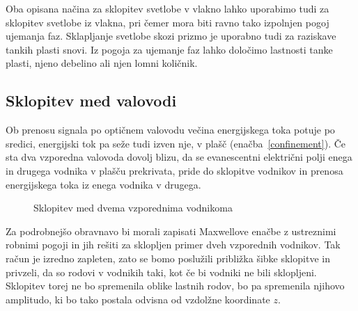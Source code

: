 \begin{remark}
 Oba opisana načina za sklopitev svetlobe v vlakno lahko uporabimo tudi za sklopitev svetlobe 
 iz vlakna, pri čemer mora biti ravno tako izpolnjen pogoj ujemanja faz. 
 Sklapljanje svetlobe skozi prizmo je uporabno tudi za raziskave tankih plasti snovi. 
 Iz pogoja za ujemanje faz lahko določimo lastnosti tanke plasti, njeno debelino ali njen lomni količnik. 
\end{remark}

\subsection*{Sklopitev med valovodi}
Ob prenosu signala po optičnem valovodu večina energijskega toka potuje po sredici,
energijski tok pa seže tudi izven nje, v plašč (enačba~\ref{confinement}). 
Če sta dva vzporedna valovoda dovolj blizu, da
se evanescentni električni polji enega in drugega vodnika v plašču prekrivata, pride do 
sklopitve vodnikov in prenosa energijskega toka iz enega vodnika v drugega. 
\begin{figure}[h]
\centering
\def\svgwidth{80truemm} 
 
\caption{Sklopitev med dvema vzporednima vodnikoma}
\label{fig:fcoupler}
\end{figure}

Za podrobnejšo obravnavo bi morali zapisati Maxwellove enačbe z ustreznimi robnimi pogoji 
in jih rešiti za sklopljen primer dveh vzporednih vodnikov. Tak račun je izredno zapleten, 
zato se bomo poslužili približka šibke sklopitve in privzeli, da so rodovi v vodnikih taki, 
kot če bi vodniki ne bili sklopljeni.
Sklopitev torej ne bo spremenila oblike lastnih rodov, bo pa spremenila njihovo amplitudo, ki 
bo tako postala odvisna od vzdolžne koordinate $z$.

